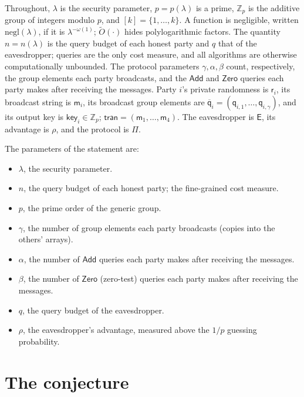 \documentclass{conjura-conjecture}
\newcommand{\Zp}{\mathbb{Z}_{p}}
\newcommand{\Add}{\mathsf{Add}}
\newcommand{\Zero}{\mathsf{Zero}}
\newcommand{\Ev}{\mathsf{E}}
\newcommand{\tran}{\mathsf{tran}}
\newcommand{\keyv}{\mathsf{key}}
\newcommand{\rv}{\mathsf{r}}
\newcommand{\mv}{\mathsf{m}}
\newcommand{\qv}{\mathsf{q}}
\newcommand{\negl}{\mathrm{negl}}
\begin{document}
Throughout, $\lambda$ is the security parameter, $p = p(\lambda)$ is a
prime, $\Zp$ is the additive group of integers modulo $p$, and
$[k] = \{1,\dots,k\}$. A function is negligible, written
$\negl(\lambda)$, if it is $\lambda^{-\omega(1)}$; $\tilde{O}(\cdot)$
hides polylogarithmic factors. The quantity $n = n(\lambda)$ is the
query budget of each honest party and $q$ that of the eavesdropper;
queries are the only cost measure, and all algorithms are otherwise
computationally unbounded. The protocol parameters $\gamma, \alpha,
\beta$ count, respectively, the group elements each party broadcasts,
and the $\Add$ and $\Zero$ queries each party makes after receiving the
messages. Party $i$'s private randomness is $\rv_{i}$, its broadcast
string is $\mv_{i}$, its broadcast group elements are
$\overline{\qv}_{i} = (\qv_{i,1},\dots,\qv_{i,\gamma})$, and its output
key is $\keyv_{i} \in \Zp$; $\tran = (\mv_{1},\dots,\mv_{4})$. The
eavesdropper is $\Ev$, its advantage is $\rho$, and the protocol is
$\Pi$.

The parameters of the statement are:
\begin{itemize}
\item $\lambda$, the security parameter.
\item $n$, the query budget of each honest party; the fine-grained cost
  measure.
\item $p$, the prime order of the generic group.
\item $\gamma$, the number of group elements each party broadcasts
  (copies into the others' arrays).
\item $\alpha$, the number of $\Add$ queries each party makes after
  receiving the messages.
\item $\beta$, the number of $\Zero$ (zero-test) queries each party
  makes after receiving the messages.
\item $q$, the query budget of the eavesdropper.
\item $\rho$, the eavesdropper's advantage, measured above the $1/p$
  guessing probability.
\end{itemize}

\section{The conjecture}\label{sec:conjectures}
\end{document}
